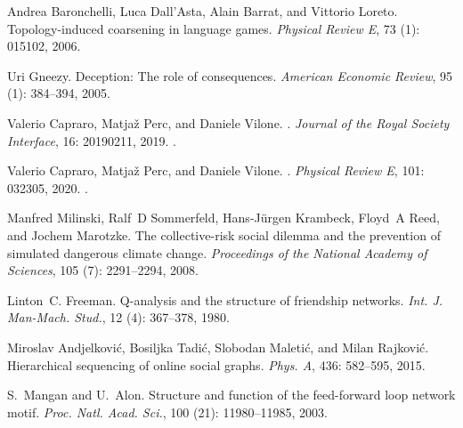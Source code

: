 Andrea Baronchelli, Luca Dall’Asta, Alain Barrat, and Vittorio Loreto.
\newblock Topology-induced coarsening in language games.
\newblock \emph{Physical Review E}, 73 (1): 015102,
2006{}.

Uri Gneezy.
\newblock Deception: The role of consequences.
\newblock \emph{American Economic Review}, 95 (1): 384--394,
2005.

Valerio Capraro, Matja{\v z} Perc, and Daniele Vilone.
.
\newblock \emph{Journal of the Royal Society Interface}, 16: 20190211,
2019.
\newblock {}.

Valerio Capraro, Matja{\v z} Perc, and Daniele Vilone.
.
\newblock \emph{Physical Review E}, 101: 032305, 2020.
\newblock {}.

Manfred Milinski, Ralf~D Sommerfeld, Hans-J{\"u}rgen Krambeck, Floyd~A Reed,
and Jochem Marotzke.
\newblock The collective-risk social dilemma and the prevention of simulated
dangerous climate change.
\newblock \emph{Proceedings of the National Academy of Sciences}, 105
(7): 2291--2294, 2008.

Linton~C. Freeman.
\newblock Q-analysis and the structure of friendship networks.
\newblock \emph{Int. J. Man-Mach. Stud.}, 12 (4): 367--378,
1980.

Miroslav Andjelkovi{\'c}, Bosiljka Tadi{\'c}, Slobodan Maleti{\'c}, and Milan
Rajkovi{\'c}.
\newblock Hierarchical sequencing of online social graphs.
\newblock \emph{Phys. A}, 436: 582--595, 2015.

S.~Mangan and U.~Alon.
\newblock Structure and function of the feed-forward loop network motif.
\newblock \emph{Proc. Natl. Acad. Sci.}, 100 (21):
11980--11985, 2003.

